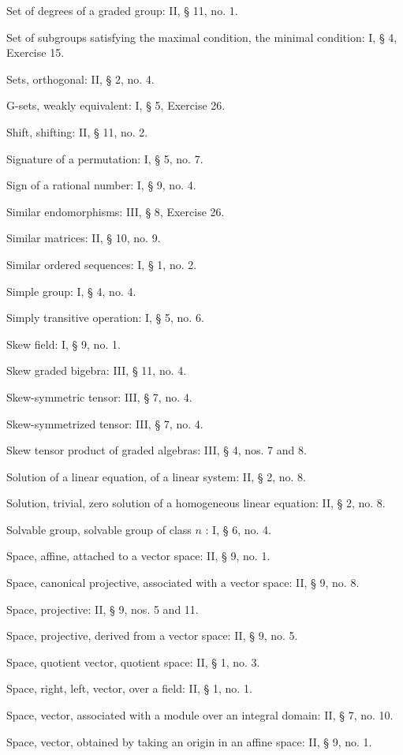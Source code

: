 Set of degrees of a graded group: II, § 11, no. 1.

Set of subgroups satisfying the maximal condition, the minimal condition: I, § 4, Exercise 15.

Sets, orthogonal: II, § 2, no. 4.

G-sets, weakly equivalent: I, § 5, Exercise 26.

Shift, shifting: II, § 11, no. 2.

Signature of a permutation: I, § 5, no. 7.

Sign of a rational number: I, § 9, no. 4.

Similar endomorphisms: III, § 8, Exercise 26.

Similar matrices: II, § 10, no. 9.

Similar ordered sequences: I, § 1, no. 2.

Simple group: I, § 4, no. 4.

Simply transitive operation: I, § 5, no. 6.

Skew field: I, § 9, no. 1.

Skew graded bigebra: III, § 11, no. 4.

Skew-symmetric tensor: III, § 7, no. 4.

Skew-symmetrized tensor: III, § 7, no. 4.

Skew tensor product of graded algebras: III, § 4, nos. 7 and 8.

Solution of a linear equation, of a linear system: II, § 2, no. 8.

Solution, trivial, zero solution of a homogeneous linear equation: II, § 2, no. 8.

Solvable group, solvable group of class \(n\) : I, § 6, no. 4.

Space, affine, attached to a vector space: II, § 9, no. 1.

Space, canonical projective, associated with a vector space: II, § 9, no. 8.

Space, projective: II, § 9, nos. 5 and 11.

Space, projective, derived from a vector space: II, § 9, no. 5.

Space, quotient vector, quotient space: II, § 1, no. 3.

Space, right, left, vector, over a field: II, § 1, no. 1.

Space, vector, associated with a module over an integral domain: II, § 7, no. 10.

Space, vector, obtained by taking an origin in an affine space: II, § 9, no. 1.

